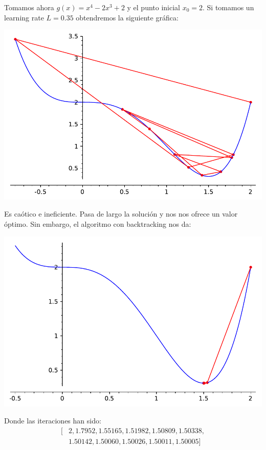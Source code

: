 \begin{example}
	Tomamos ahora $g(x) = x^4 - 2x^3 + 2$ y el punto inicial $x_0 = 2$. Si tomamos un learning rate $L = 0.35$ obtendremos la siguiente gráfica:\\
	\begin{centering}
	\includegraphics[scale=0.5]{imagenes/ejemplo2_maximodescensosimplificado.pdf} \\
	\end{centering}
	Es caótico e ineficiente. Pasa de largo la solución y nos nos ofrece un valor óptimo. Sin embargo, el algoritmo con backtracking nos da:\\
	\begin{centering}
	\includegraphics[scale=0.5]{imagenes/ejemplo2_maximodescenso.pdf} \\
	\end{centering}
	Donde las iteraciones han sido:
	\begin{equation*}
		\begin{aligned}
			[&2,1.7952,1.55165,1.51982,1.50809,1.50338,\\
			 &1.50142,1.50060,1.50026,1.50011,1.50005]
		\end{aligned}
	\end{equation*} 
\end{example}
